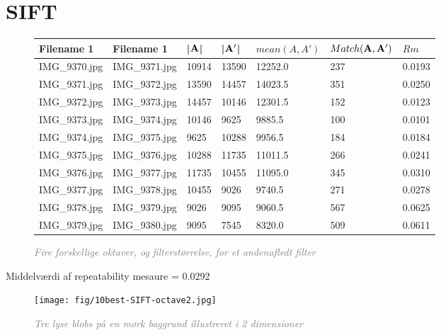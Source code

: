 \section{SIFT}
\begin{figure}[H]
    \centering
    \begin{center}    
    \begin{tabular}{ | l | l | l | l | l | l | l |}
    \hline
    Filename 1 & Filename 1 & |$\bold{A}$| & |$\bold{A'}$| & $mean(A,A')$ & $Match(\bold{A}, \bold{A}')$ & $Rm$ \\ \hline
IMG\_9370.jpg &	IMG\_9371.jpg &	10914 &	13590 &	12252.0 &	237 &	0.0193\\ \hline
IMG\_9371.jpg &	IMG\_9372.jpg &	13590 &	14457 &	14023.5 &	351 &	0.0250\\ \hline
IMG\_9372.jpg &	IMG\_9373.jpg &	14457 &	10146 &	12301.5 &	152 &	0.0123\\ \hline
IMG\_9373.jpg &	IMG\_9374.jpg &	10146 &	9625 &	9885.5 &	100 &	0.0101\\ \hline
IMG\_9374.jpg &	IMG\_9375.jpg &	9625 &	10288 &	9956.5 &	184 &	0.0184\\ \hline
IMG\_9375.jpg &	IMG\_9376.jpg &	10288 &	11735 &	11011.5 &	266 &	0.0241\\ \hline
IMG\_9376.jpg &	IMG\_9377.jpg &	11735 &	10455 &	11095.0 &	345 &	0.0310\\ \hline
IMG\_9377.jpg &	IMG\_9378.jpg &	10455 &	9026 &	9740.5 &	271 &	0.0278\\ \hline
IMG\_9378.jpg &	IMG\_9379.jpg &	9026 &	9095 &	9060.5 &	567 &	0.0625\\ \hline
IMG\_9379.jpg &	IMG\_9380.jpg &	9095 &	7545 &	8320.0 &	509 &	0.0611\\ \hline
    \end{tabular}       
    \caption{\textcolor{gray}{\footnotesize \textit{Fire forskellige oktaver, og filterstørrelse, for et andenafledt filter}}}
    \label{tab:SURFOCTAVE2}
     \end{center}
     \vspace{-2.5em}
\end{figure} \noindent
Middelværdi af repeatability mesaure = 0.0292

\begin{figure}[H]
    \centering
    \texttt{[image: fig/10best-SIFT-octave2.jpg]}
    \vspace{-0.5em}   
    \begin{center}
    \caption{\textcolor{gray}{\footnotesize \textit{
    Tre lyse blobs på en mørk baggrund illustreret i 2 dimensioner \cite{blob}}}}
    \label{fig:lindblob}
     \end{center}
  \end{figure}
       \vspace{-2.7em}
\noindent





